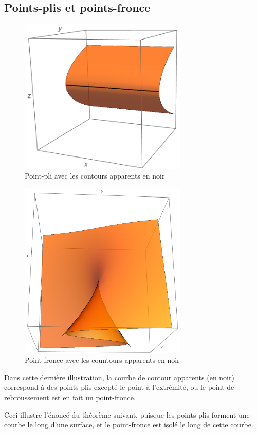 \documentclass[a4paper]{article}
\theoremstyle{definition}
\begin{document}
\subsection{Points-plis et points-fronce}
\begin{figure}[H]\includegraphics[width=8cm, keepaspectratio]{images/fold_front.png}\caption{Point-pli avec les contours apparents en noir}\end{figure}
\begin{figure}[H]\includegraphics[width=8cm, keepaspectratio]{images/cusp_side.png}\caption{Point-fronce avec les countours apparents en noir}\end{figure}

Dans cette dernière illustration, la courbe de contour apparents (en noir) correspond à des points-plis excepté le point à l'extrémité, ou le point de rebroussement est en fait un point-fronce.

Ceci illustre l'énoncé du théorème suivant, puisque les points-plis forment une courbe le long d'une surface, et le point-fronce est isolé le long de cette courbe.
\end{document}
